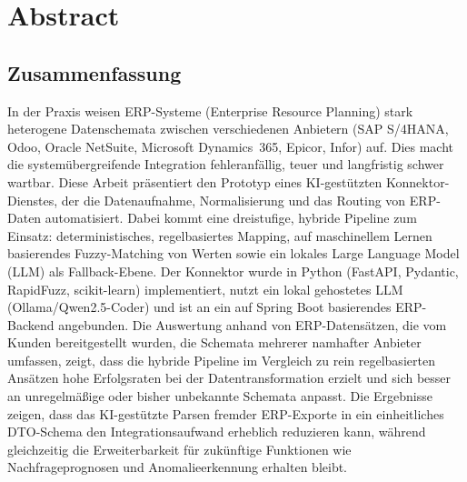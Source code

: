\documentclass{article}
\begin{document}

\newpage
{}

\tableofcontents
\newpage

\section{Abstract}

\subsection*{Zusammenfassung}
In der Praxis weisen ERP-Systeme (Enterprise Resource Planning) stark heterogene Datenschemata
zwischen verschiedenen Anbietern (SAP S/4HANA, Odoo, Oracle NetSuite, Microsoft Dynamics~365,
Epicor, Infor) auf. Dies macht die systemübergreifende Integration fehleranfällig, teuer und
langfristig schwer wartbar.
Diese Arbeit präsentiert den Prototyp eines KI-gestützten Konnektor-Dienstes, der die
Datenaufnahme, Normalisierung und das Routing von ERP-Daten automatisiert.
Dabei kommt eine dreistufige, hybride Pipeline zum Einsatz: deterministisches, regelbasiertes
Mapping, auf maschinellem Lernen basierendes Fuzzy-Matching von Werten sowie ein lokales Large
Language Model (LLM) als Fallback-Ebene.
Der Konnektor wurde in Python (FastAPI, Pydantic, RapidFuzz, scikit-learn) implementiert, nutzt
ein lokal gehostetes LLM (Ollama/Qwen2.5-Coder) und ist an ein auf Spring Boot basierendes
ERP-Backend angebunden.
Die Auswertung anhand von ERP-Datensätzen, die vom Kunden bereitgestellt wurden, die Schemata mehrerer namhafter Anbieter
umfassen, zeigt, dass die hybride Pipeline im Vergleich zu rein regelbasierten Ansätzen hohe
Erfolgsraten bei der Datentransformation erzielt und sich besser an unregelmäßige oder bisher
unbekannte Schemata anpasst.
Die Ergebnisse zeigen, dass das KI-gestützte Parsen fremder ERP-Exporte in ein einheitliches
DTO-Schema den Integrationsaufwand erheblich reduzieren kann, während gleichzeitig die
Erweiterbarkeit für zukünftige Funktionen wie Nachfrageprognosen und Anomalieerkennung
erhalten bleibt.
\end{document}
